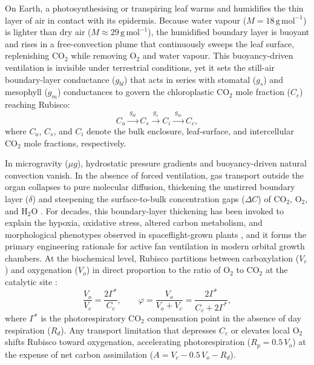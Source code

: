\documentclass[final,5p,times,twocolumn,numbers,sort&compress]{elsarticle}
\begin{document}
On Earth, a photosynthesising or transpiring leaf warms and humidifies the thin layer of air in contact with its epidermis. Because water vapour ($M = 18\,\mathrm{g\,mol^{-1}}$) is lighter than dry air ($M \approx 29\,\mathrm{g\,mol^{-1}}$), the humidified boundary layer is buoyant and rises in a free-convection plume that continuously sweeps the leaf surface, replenishing $\mathrm{CO_2}$ while removing $\mathrm{O_2}$ and water vapour. This buoyancy-driven ventilation is invisible under terrestrial conditions, yet it sets the still-air boundary-layer conductance ($g_{bl}$) that acts in series with stomatal ($g_s$) and mesophyll ($g_m$) conductances to govern the chloroplastic $\mathrm{CO_2}$ mole fraction ($C_c$) reaching Rubisco:
\begin{equation}
C_a \xrightarrow{\;g_{bl}\;} C_s \xrightarrow{\;g_s\;} C_i \xrightarrow{\;g_m\;} C_c ,
\label{eq:conductance_chain}
\end{equation}
where $C_a$, $C_s$, and $C_i$ denote the bulk enclosure, leaf-surface, and intercellular $\mathrm{CO_2}$ mole fractions, respectively.

In microgravity ($\mu g$), hydrostatic pressure gradients and buoyancy-driven natural convection vanish. In the absence of forced ventilation, gas transport outside the organ collapses to pure molecular diffusion, thickening the unstirred boundary layer ($\delta$) and steepening the surface-to-bulk concentration gaps ($\Delta C$) of $\mathrm{CO_2}$, $\mathrm{O_2}$, and $\mathrm{H_2O}$ \citep{porterfield2002,kitaya2003}. For decades, this boundary-layer thickening has been invoked to explain the hypoxia, oxidative stress, altered carbon metabolism, and morphological phenotypes observed in spaceflight-grown plants \citep{porterfield2002,correll2013,barker2023}, and it forms the primary engineering rationale for active fan ventilation in modern orbital growth chambers. At the biochemical level, Rubisco partitions between carboxylation ($V_c$) and oxygenation ($V_o$) in direct proportion to the ratio of $\mathrm{O_2}$ to $\mathrm{CO_2}$ at the catalytic site \citep{farquhar1980}:
\begin{equation}
\frac{V_o}{V_c} = \frac{2\Gamma^*}{C_c}, \qquad \varphi = \frac{V_o}{V_o + V_c} = \frac{2\Gamma^*}{C_c + 2\Gamma^*},
\label{eq:rubisco_partition}
\end{equation}
where $\Gamma^*$ is the photorespiratory $\mathrm{CO_2}$ compensation point in the absence of day respiration ($R_d$). Any transport limitation that depresses $C_c$ or elevates local $\mathrm{O_2}$ shifts Rubisco toward oxygenation, accelerating photorespiration ($R_p = 0.5\,V_o$) at the expense of net carbon assimilation ($A = V_c - 0.5\,V_o - R_d$).
\end{document}
